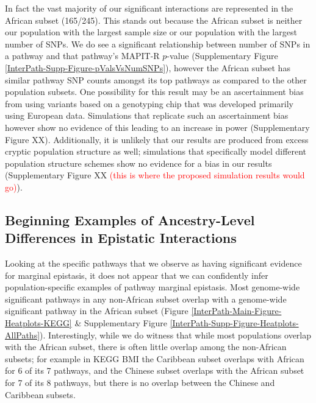 \documentclass[12pt, a4paper]{article}
\begin{document}
In fact the vast majority of our significant interactions are represented in the African subset (165/245). This stands out because the African subset is neither our population with the largest sample size or our population with the largest number of SNPs. We do see a significant relationship between number of SNPs in a pathway and that pathway's MAPIT-R $p$-value (Supplementary Figure \ref{InterPath-Supp-Figure-pValsVsNumSNPs}), however the African subset has similar pathway SNP counts amongst its top pathways as compared to the other population subsets. One possibility for this result may be an ascertainment bias from using variants based on a genotyping chip that was developed primarily using European data. Simulations that replicate such an ascertainment bias however show no evidence of this leading to an increase in power (Supplementary Figure XX). Additionally, it is unlikely that our results are produced from excess cryptic population structure as well; simulations that specifically model different population structure schemes show no evidence for a bias in our results (Supplementary Figure XX \textcolor{red}{(this is where the proposed simulation results would go)}). 


\subsection{Beginning Examples of Ancestry-Level Differences in Epistatic Interactions}

Looking at the specific pathways that we observe as having significant evidence for marginal epistasis, it does not appear that we can confidently infer population-specific examples of pathway marginal epistasis. Most genome-wide significant pathways in any non-African subset overlap with a genome-wide significant pathway in the African subset (Figure \ref{InterPath-Main-Figure-Heatplots-KEGG} \& Supplementary Figure \ref{InterPath-Supp-Figure-Heatplots-AllPaths}). Interestingly, while we do witness that while most populations overlap with the African subset, there is often little overlap among the non-African subsets; for example in KEGG BMI the Caribbean subset overlaps with African for 6 of its 7 pathways, and the Chinese subset overlaps with the African subset for 7 of its 8 pathways, but there is no overlap between the Chinese and Caribbean subsets.
\end{document}
